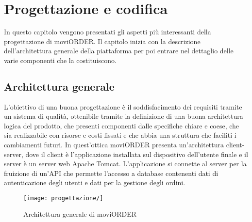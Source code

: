 
\chapter{Progettazione e codifica}
\label{cap:progettazione-codifica}

In questo capitolo vengono presentati gli aspetti più interessanti della progettazione di moviORDER. Il capitolo inizia con la descrizione dell'architettura generale della piattaforma per poi entrare nel dettaglio delle varie componenti che la costituiscono.

\section{Architettura generale}

L'obiettivo di una buona progettazione è il soddisfacimento dei requisiti tramite un sistema di qualità, ottenibile tramite la definizione di una buona architettura logica del prodotto, che presenti componenti dalle specifiche chiare e coese, che sia realizzabile con risorse e costi fissati e che abbia una struttura che faciliti i cambiamenti futuri. In quest'ottica moviORDER presenta un'architettura client-server, dove il client è l'applicazione installata sul dispositivo dell'utente finale e il server è un server web Apache Tomcat. L'applicazione si connette al server per la fruizione di un'API che permette l'accesso a database contenenti dati di autenticazione degli utenti e dati per la gestione degli ordini.

\begin{figure}[!h] 
    \centering 
    \texttt{[image: progettazione/]} 
    \caption{Architettura generale di moviORDER}
\end{figure}


